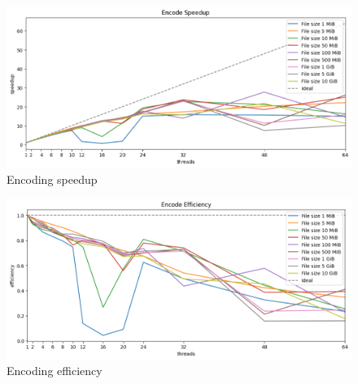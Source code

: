 \begin{figure}
	\centering
	\includegraphics[width=1\linewidth]{"../imgs/encoding speedup wide"}
	\caption{Encoding speedup}
	\label{fig:encoding-speedup}
\end{figure}
\begin{figure}
	\centering
	\includegraphics[width=1\linewidth]{"../imgs/encode efficiency wide"}
	\caption{Encoding efficiency}
	\label{fig:encoding-efficiency}
\end{figure}
